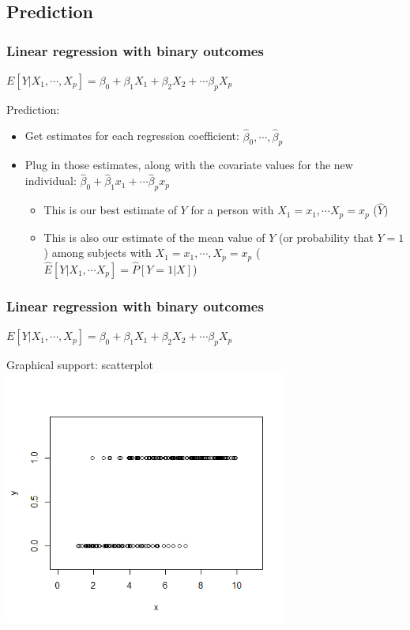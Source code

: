 \documentclass[12pt, 
hyperref={colorlinks=true, linkcolor=blue, urlcolor=cyan}]{beamer}
\begin{document}
\subsection{Prediction}
\begin{frame}
\frametitle{Linear regression with binary outcomes}
\begin{center} $E[Y|X_1,\cdots,X_p] = \beta_0 + \beta_1 X_1 + \beta_2 X_2 + \cdots \beta_p X_p$ \end{center}

\color{blue} Prediction:\vspace{-0.3cm} \color{black}
\begin{itemize} \itemsep +5pt
\item Get estimates for each regression coefficient: $\hat\beta_0, \cdots, \hat\beta_p$ \pause
\item Plug in those estimates, along with the covariate values for the new individual: $\hat\beta_0 + \hat\beta_1 x_1 + \cdots \hat\beta_p x_p$ \pause
	\begin{itemize} \itemsep +5pt
	\item This is our best estimate of $Y$ for a person with $X_1 = x_1, \cdots X_p = x_p$ ($\hat{Y}$) \pause
	\item This is also our estimate of the mean value of $Y$ (or probability that $Y=1$) among subjects with $X_1 = x_1, \cdots, X_p = x_p$ ($\hat{E}[Y|X_1,\cdots X_p] = \hat{P}[Y=1|X]$)
	\end{itemize}
\end{itemize}

\end{frame}

\begin{frame}
\frametitle{Linear regression with binary outcomes}
\begin{center} $E[Y|X_1,\cdots,X_p] = \beta_0 + \beta_1 X_1 + \beta_2 X_2 + \cdots \beta_p X_p$ \end{center}

\color{blue} Graphical support: \color{black} scatterplot
\vspace{-0.55cm}
\center
\includegraphics[width=0.7\textwidth]{./figs/scatterplot}
\end{frame}
\end{document}
